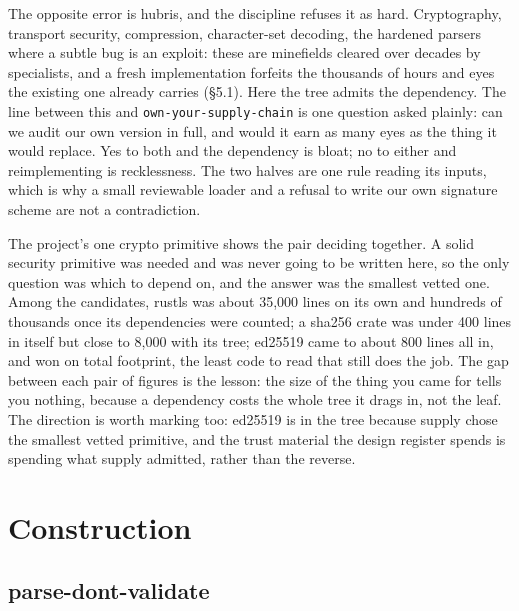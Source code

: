 The opposite error is hubris, and the discipline refuses it as hard.
Cryptography, transport security, compression, character-set decoding,
the hardened parsers where a subtle bug is an exploit: these are
minefields cleared over decades by specialists, and a fresh
implementation forfeits the thousands of hours and eyes the existing one
already carries (§5.1). Here the tree admits the dependency. The line
between this and \texttt{own-your-supply-chain} is one question asked
plainly: can we audit our own version in full, and would it earn as many
eyes as the thing it would replace. Yes to both and the dependency is
bloat; no to either and reimplementing is recklessness. The two halves
are one rule reading its inputs, which is why a small reviewable loader
and a refusal to write our own signature scheme are not a contradiction.

The project's one crypto primitive shows the pair deciding together. A
solid security primitive was needed and was never going to be written
here, so the only question was which to depend on, and the answer was
the smallest vetted one. Among the candidates, rustls was about 35,000
lines on its own and hundreds of thousands once its dependencies were
counted; a sha256 crate was under 400 lines in itself but close to 8,000
with its tree; ed25519 came to about 800 lines all in, and won on total
footprint, the least code to read that still does the job. The gap
between each pair of figures is the lesson: the size of the thing you
came for tells you nothing, because a dependency costs the whole tree it
drags in, not the leaf. The direction is worth marking too: ed25519 is
in the tree because supply chose the smallest vetted primitive, and the
trust material the design register spends is spending what supply
admitted, rather than the reverse.

\hypertarget{construction}{%
\section{Construction}\label{construction}}

\hypertarget{parse-dont-validate}{%
\subsection{parse-dont-validate}\label{parse-dont-validate}}

